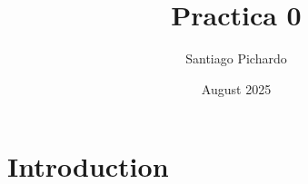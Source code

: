 \documentclass{article}
\title{Practica 0}
\author{Santiago Pichardo}
\date{August 2025}
\begin{document}
\maketitle

\section{Introduction}
\end{document}
